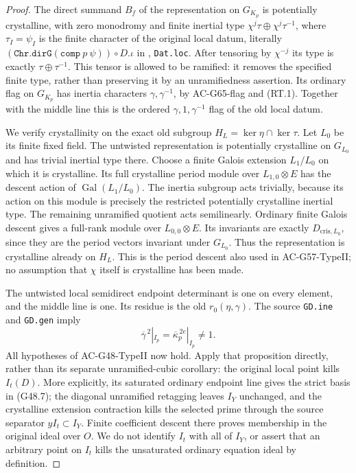 \begin{proof}
The direct summand \(B_f\) of the representation on
\(G_{K_p}\) is potentially crystalline, with zero
monodromy and finite inertial type
\(\chi^j\tau\oplus\chi^j\tau^{-1}\), where
\(\tau_I=\psi_I\) is the finite character of the
original local datum, literally
\((\texttt{Chr.dirG}(\texttt{comp}\ p\ \psi))\circ D.\iota\)
in ,
\texttt{Dat.loc}. After tensoring by \(\chi^{-j}\)
its type is exactly \(\tau\oplus\tau^{-1}\).
This tensor is allowed to be ramified: it removes the
specified finite type, rather than preserving it by an
unramifiedness assertion. Its ordinary flag on
\(G_{K_p}\) has inertia characters
\(\gamma,\gamma^{-1}\), by AC-G65-flag and (RT.1).
Together with the middle line this is the ordered
\(\gamma,1,\gamma^{-1}\) flag of the old local datum.

We verify crystallinity on the exact old subgroup
\(H_L=\ker\eta\cap\ker\tau\).
Let \(L_0\) be its finite fixed field. The untwisted
representation is potentially crystalline on
\(G_{L_0}\) and has trivial inertial type there.
Choose a finite Galois extension \(L_1/L_0\) on which
it is crystalline. Its full crystalline period module
over \(L_{1,0}\otimes E\) has the descent action of
\(\operatorname{Gal}(L_1/L_0)\). The inertia subgroup
acts trivially, because its action on this module is
precisely the restricted potentially crystalline
inertial type. The remaining unramified quotient acts
semilinearly. Ordinary finite Galois descent gives a
full-rank module over \(L_{0,0}\otimes E\).
Its invariants are exactly
\(D_{\mathrm{cris},L_0}\), since they are the period
vectors invariant under \(G_{L_0}\). Thus the
representation is crystalline already on \(H_L\).
This is the period descent also used in
AC-G57-TypeII; no assumption that \(\chi\) itself
is crystalline has been made.

The untwisted local semidirect endpoint determinant is
one on every element, and the middle line is one.
Its residue is the old \(r_0(\eta,\gamma)\).
The source \texttt{GD.ine} and \texttt{GD.gen} imply
\[
           \overline\gamma^{\,2}|_{I_p}
                =\overline\kappa_p^{\,2e}|_{I_p}\ne1.
                                                        \tag{RT.4}
\]
All hypotheses of AC-G48-TypeII now hold. Apply that
proposition directly, rather than its separate
unramified-cubic corollary: the original local point
kills \(I_t(D)\). More explicitly, its saturated
ordinary endpoint line gives the strict basis in
(G48.7); the diagonal unramified retagging leaves
\(I_Y\) unchanged, and the crystalline extension
contraction kills the selected prime through the
source separator \(yI_t\subset I_Y\).
Finite coefficient descent there proves membership
in the original ideal over \(O\).
We do not identify \(I_t\) with all of \(I_Y\),
or assert that an arbitrary point on \(I_t\) kills
the unsaturated ordinary equation ideal by definition.


\end{proof}

